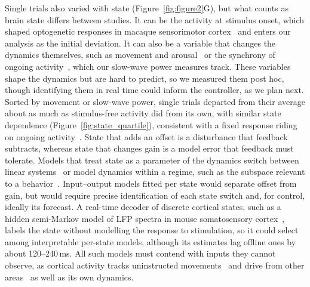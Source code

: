 Single trials also varied with state (Figure~\ref{fig:figure2}G), but what counts as brain state differs between studies.
It can be the activity at stimulus onset, which shaped optogenetic responses in macaque sensorimotor cortex~\citep{bryan2025temporal} and enters our analysis as the initial deviation.
It can also be a variable that changes the dynamics themselves, such as movement and arousal~\citep{Niell2010,Vinck2015,McGinley2015waking} or the synchrony of ongoing activity~\citep{Poulet2008,Harris2011}, which our slow-wave power measures track.
These variables shape the dynamics but are hard to predict, so we measured them post hoc, though identifying them in real time could inform the controller, as we plan next.
Sorted by movement or slow-wave power, single trials departed from their average about as much as stimulus-free activity did from its own, with similar state dependence (Figure~\ref{fig:state_quartile}), consistent with a fixed response riding on ongoing activity~\citep{Arieli1996,Shimaoka2019}.
State that adds an offset is a disturbance that feedback subtracts, whereas state that changes gain is a model error that feedback must tolerate.
Models that treat state as a parameter of the dynamics switch between linear systems~\citep{linderman2017rslds} or model dynamics within a regime, such as the subspace relevant to a behavior~\citep{sani2021modeling}.
Input--output models fitted per state would separate offset from gain, but would require precise identification of each state switch and, for control, ideally its forecast.
A real-time decoder of discrete cortical states, such as a hidden semi-Markov model of LFP spectra in mouse somatosensory cortex~\citep{weiss2024realtime}, labels the state without modelling the response to stimulation, so it could select among interpretable per-state models, although its estimates lag offline ones by about 120--240\,ms.
All such models must contend with inputs they cannot observe, as cortical activity tracks uninstructed movements~\citep{musall2019single,stringer2019spontaneous} and drive from other areas~\citep{zagha2013motor,harris2013topdown} as well as its own dynamics.


